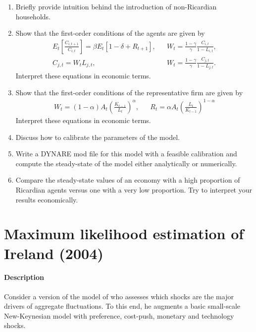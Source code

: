 \documentclass{article}
\begin{document}
\begin{enumerate}
	\item Briefly provide intuition behind the introduction of non-Ricardian households.
	\item Show that the first-order conditions of the agents are given by
		\begin{align*}
		E_t\left[\frac{C_{i,t+1}}{C_{i,t}}\right] = \beta E_t\left[1-\delta + R_{t+1}\right],&&		
		W_t = \frac{1-\gamma}{\gamma} \frac{C_{i,t}}{1-L_{i,t}},\\
		C_{j,t} = W_t L_{j,t}, &&
		W_t = \frac{1-\gamma}{\gamma} \frac{C_{j,t}}{1-L_{j,t}}.
		\end{align*}
	Interpret these equations in economic terms.
	
	\item Show that the first-order conditions of the representative firm are given by
	\begin{align*}
	W_t = (1-\alpha) A_t \left(\frac{K_{t-1}}{L_t}\right)^\alpha, &&	R_t = \alpha A_t \left(\frac{L_t}{K_{t-1}}\right)^{1-\alpha}
	\end{align*}
	Interpret these equations in economic terms.
	\item Discuss how to calibrate the parameters of the model.
	\item Write a DYNARE mod file for this model with a feasible calibration and compute the steady-state of the model either analytically or numerically.
	\item Compare the steady-state values of an economy with a high proportion of Ricardian agents versus one with a very low proportion.
	Try to interpret your results economically.
\end{enumerate} 

\newpage 

\section[Maximum likelihood estimation of Ireland (2004)]{Maximum likelihood estimation of Ireland (2004)\label{ex:Ireland2004ML}}
\paragraph{Description}
Consider a version of the model of \textcite{Ireland_2004_TechnologyShocksNew} who assesses which shocks are the major drivers of aggregate fluctuations.
To this end, he augments a basic small-scale New-Keynesian model with preference, cost-push, monetary and technology shocks.
\end{document}
